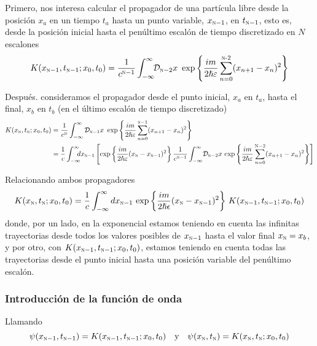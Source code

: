 Primero, nos interesa calcular el propagador de una partícula libre
desde la posición $x_a$ en un tiempo $t_a$ hasta un punto variable,
$x_{\textsc{n}-1}$, en $t_{\textsc{n}-1}$, esto es, desde la posición
inicial hasta el penúltimo escalón de tiempo discretizado en $N$
escalones
\[
  K(x_{\textsc{n}-1},t_{\textsc{n}-1};x_0,t_0)
  =
  \dfrac{1}{c^{\textsc{n}-1}}
  \int_{-\infty}^{\infty}\!\!\mathcal{D}_{\textsc{n}-2}x\,\,
  \exp\left\{
    \dfrac{im}{2\hslash\varepsilon}
    \sum_{n=0}^{\textsc{\textsc{n}-2}} (x_{n+1}-x_n)^2
  \right\}
\]

Después. consideramos el propagador desde el punto inicial, $x_a$ en
$t_a$, hasta el final, $x_b$ en $t_b$ (en el último escalón de tiempo
discretizado)
{\small
\begin{align*}
  K(x_{\textsc{n}},t_{\textsc{n}};x_0,t_0)
  &=
  \dfrac{1}{c^{\textsc{n}}}
  \int_{-\infty}^{\infty}\mathcal{D}_{\textsc{n}-1}x\,\,
  \exp\left\{
    \dfrac{im}{2\hslash\varepsilon}
    \sum_{n=0}^{\textsc{n}-1}(x_{n+1}-x_n)^2
    \right\}\\
  &=
    \dfrac{1}{c}
    \int_{-\infty}^{\infty}\!\!\!\!dx_{\textsc{n}-1}
    \left[
    \exp\left\{
    \dfrac{im}{2\hslash\varepsilon}
    (x_{\textsc{n}}-x_{\textsc{n}-1})^2
    \right\}
    \dfrac{1}{c^{\textsc{n}-1}}
    \int_{-\infty}^{\infty}\!\mathcal{D}_{\textsc{n}-2}x\,
  \exp\left\{
    \dfrac{im}{2\hslash\varepsilon}
    \sum_{n=0}^{\textsc{N}-2}(x_{n+1}-x_n)^2
    \right\}
    \right]
\end{align*}
}

Relacionando ambos propagadores
\[
  K(x_{\textsc{n}},t_{\textsc{n}};x_0,t_0)
  =
  \dfrac{1}{c}
  \int_{-\infty}^{\infty} dx_{\textsc{n}-1}\,
  \exp\left\{
    \frac{im}{2\hslash\epsilon}
    (x_{\textsc{n}}-x_{\textsc{n}-1})^2
  \right\}
  \, K(x_{\textsc{n}-1},t_{\textsc{n}-1};x_0,t_0)
\]
donde, por un lado, en la exponencial estamos teniendo en cuenta las
infinitas trayectorias desde todos los valores posibles de
$x_{\textsc{n}-1}$ hasta el valor final $x_{\textsc{n}}=x_b$, y por
otro, con $K(x_{\textsc{n}-1},t_{\textsc{n}-1};x_0,t_0)$, estamos
teniendo en cuenta todas las trayectorias desde el punto inicial hasta
una posición variable del penúltimo escalón.

\subsubsection{Introducción de la función de onda}
Llamando
\[
  \psi(x_{\textsc{n}-1},t_{\textsc{n}-1}) = K(x_{\textsc{n}-1},t_{\textsc{n}-1};x_0,t_0)
  \hspace{1em}\text{y}\hspace{1em}
  \psi(x_{\textsc{n}},t_{\textsc{n}}) = K(x_{\textsc{n}},t_{\textsc{n}};x_0,t_0)
\]

